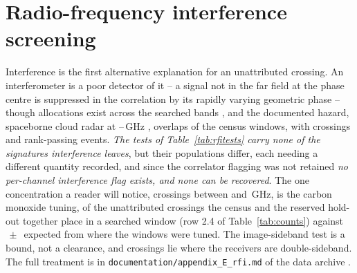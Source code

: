 \section{Radio-frequency interference screening}
\label{app:rfi}

Interference is the first alternative explanation for an unattributed
crossing. An interferometer is a poor detector of it -- a signal not in the far
field at the phase centre is suppressed in the correlation by its rapidly
varying geometric phase -- though allocations exist across the searched bands
\citep{ITU2024}, and the documented hazard, spaceborne cloud radar at
\RadarLo--\RadarHi\,GHz \citep{CloudSat2002,EarthCARE2023,ALMAMemo504},
overlaps \RadarNWin{} of the \RadarNTot{} census windows, with
\RadarNCross{} crossings and \RadarNStage{} rank-passing events.
\emph{The tests of Table~\ref{tab:rfitests} carry none of the signatures
interference leaves}, but their populations differ, each needing a different
quantity recorded, and since the correlator flagging was not retained
\emph{no per-channel interference flag exists, and none can be recovered}.
The one concentration a reader will notice, \TlBandAll{} crossings between
\TlBandLo{} and \TlBandHi\,GHz, is the carbon monoxide tuning, \TlBandObs{} of
the \TlBandNSub{} unattributed crossings the census and the reserved hold-out
together place in a searched window (row 2.4 of
Table~\ref{tab:counts}) against \TlBandNull$\,\pm\,$\TlBandNullSd{} expected
from where the windows were tuned. The image-sideband test is a bound, not a
clearance, and \ImNDsb{} crossings lie where the receivers are
double-sideband. The full treatment is in
\texttt{documentation/\allowbreak appendix\_E\_rfi.md} of the data archive
\citep{SIdeposit}.

